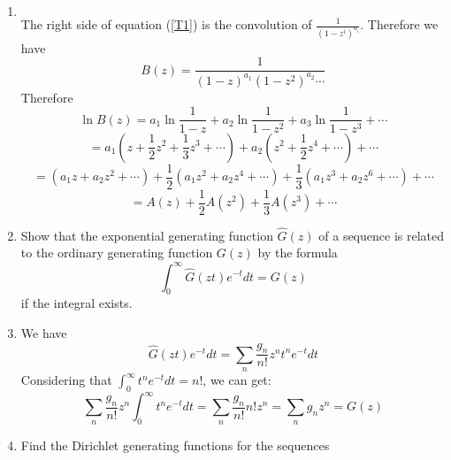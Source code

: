 \documentclass[12pt,a4paper]{article}
\makeatletter
\newtheorem*{solution}{Solution}
\theoremstyle{definition}
\renewenvironment{solution}[1][Solution] {\par\pushQED{\qed}\normalfont\topsep6\p@\@plus6\p@\relax\trivlist\item[\hskip\labelsep\bfseries#1\@addpunct{.}]\ignorespaces}{\popQED\endtrivlist\@endpefalse} \makeatother
\makeatother
\begin{document}
\begin{enumerate}
\begin{solution}
\begin{equation*}
        	\end{equation*}
        	The right side of equation (\ref{T1}) is the convolution of $\frac{1}{(1-z^i)^{a_i}}$.
        	Therefore we have
        	\begin{equation*}
        	    B(z)=\frac{1}{(1-z)^{a_1}(1-z^2)^{a_2}\cdots}
        	\end{equation*}
        	Therefore 
        	\begin{equation*}
        	    \ln B(z)=a_1\ln\frac{1}{1-z}+a_2\ln\frac{1}{1-z^2}+a_3\ln\frac{1}{1-z^3}+\cdots
        	\end{equation*}
        	\begin{equation*}
        	    =a_1(z+\frac{1}{2}z^2+\frac{1}{3}z^3+\cdots)+a_2(z^2+\frac{1}{2}z^4+\cdots)+\cdots
        	\end{equation*}
        	\begin{equation*}
        	    =(a_1z+a_2z^2+\cdots)+\frac{1}{2}(a_1z^2+a_2z^4+\cdots)+\frac{1}{3}(a_1z^3+a_2z^6+\cdots)+\cdots
        	\end{equation*}
        	\begin{equation*}
        	    =A(z)+\frac{1}{2}A(z^2)+\frac{1}{3}A(z^3)+\cdots
        	\end{equation*}
        \end{solution}
    \item 
        Show that the exponential generating function $\hat{G}(z)$ of a sequence is related to the ordinary generating function $G(z)$ by the formula 
        \begin{equation*}
            \int_{0}^{\infty} \hat{G}(zt)e^{-t}dt=G(z)
        \end{equation*}
        if the integral exists.
        \begin{solution}
        	We have 
        	\begin{equation*}
        	    \hat{G}(zt)e^{-t}dt=\sum_n \frac{g_n}{n!}z^nt^ne^{-t}dt
        	\end{equation*}
        	Considering that $\int_{0}^{\infty}t^ne^{-t}dt=n!$, we can get:
        	\begin{equation*}
        	    \sum_n \frac{g_n}{n!}z^n \int_{0}^{\infty} t^ne^{-t}dt=\sum_n \frac{g_n}{n!} n!z^n=\sum_n g_nz^n=G(z) 
        	\end{equation*}
        \end{solution}
    \item 
        Find the Dirichlet generating functions for the sequences 
        \begin{enumerate}

\end{enumerate}
\end{enumerate}
\end{document}
